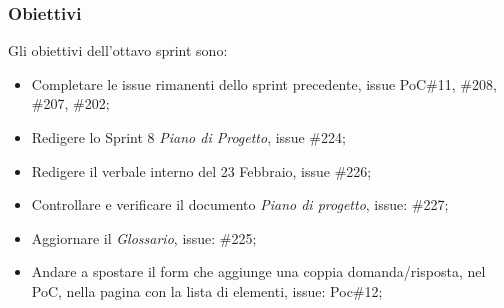 \subsubsection{Obiettivi}
\label{sec:sprint8_obiettivi}
Gli obiettivi dell'ottavo sprint sono:
\begin{itemize}
    \item Completare le issue rimanenti dello sprint precedente, issue PoC\#11, \#208, \#207, \#202;
    \item Redigere lo Sprint 8 \textit{Piano di Progetto}, issue \#224;
    \item Redigere il verbale interno del 23 Febbraio, issue \#226;
    \item Controllare e verificare il documento \textit{Piano di progetto}, issue: \#227;
    \item Aggiornare il \textit{Glossario}, issue: \#225;
    \item Andare a spostare il form che aggiunge una coppia domanda/risposta, nel PoC, nella pagina con la lista di elementi, issue: Poc\#12;
\end{itemize}